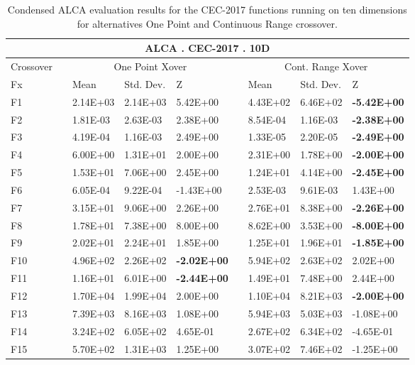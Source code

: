 \documentclass[graybox]{svmult}
\begin{document}
    \begin{table}[]
    \scriptsize
    \centering
    \caption{Condensed ALCA evaluation results for the CEC-2017 functions running on ten dimensions for alternatives One Point and Continuous Range crossover.}\label{tab.condensed_evaluation_10D}
    \begin{tabular}{@{}lllllllll@{}}
    \toprule
    \multicolumn{9}{c}{\textbf{ALCA . CEC-2017 . 10D}} \\ \midrule
    Crossover &  & \multicolumn{3}{c}{One Point Xover} &  & \multicolumn{3}{c}{Cont. Range Xover} \\
    Fx &  & Mean & Std. Dev. & Z &  & Mean & Std. Dev. & Z \\
    F1 &  & 2.14E+03 & 2.14E+03 & 5.42E+00 &  & 4.43E+02 & 6.46E+02 & \textbf{-5.42E+00} \\
    F2 &  & 1.81E-03 & 2.63E-03 & 2.38E+00 &  & 8.54E-04 & 1.16E-03 & \textbf{-2.38E+00} \\
    F3 &  & 4.19E-04 & 1.16E-03 & 2.49E+00 &  & 1.33E-05 & 2.20E-05 & \textbf{-2.49E+00} \\
    F4 &  & 6.00E+00 & 1.31E+01 & 2.00E+00 &  & 2.31E+00 & 1.78E+00 & \textbf{-2.00E+00} \\
    F5 &  & 1.53E+01 & 7.06E+00 & 2.45E+00 &  & 1.24E+01 & 4.14E+00 & \textbf{-2.45E+00} \\
    F6 &  & 6.05E-04 & 9.22E-04 & -1.43E+00 &  & 2.53E-03 & 9.61E-03 & 1.43E+00 \\
    F7 &  & 3.15E+01 & 9.06E+00 & 2.26E+00 &  & 2.76E+01 & 8.38E+00 & \textbf{-2.26E+00} \\
    F8 &  & 1.78E+01 & 7.38E+00 & 8.00E+00 &  & 8.62E+00 & 3.53E+00 & \textbf{-8.00E+00} \\
    F9 &  & 2.02E+01 & 2.24E+01 & 1.85E+00 &  & 1.25E+01 & 1.96E+01 & \textbf{-1.85E+00} \\
    F10 &  & 4.96E+02 & 2.26E+02 & \textbf{-2.02E+00} &  & 5.94E+02 & 2.63E+02 & 2.02E+00 \\
    F11 &  & 1.16E+01 & 6.01E+00 & \textbf{-2.44E+00} &  & 1.49E+01 & 7.48E+00 & 2.44E+00 \\
    F12 &  & 1.70E+04 & 1.99E+04 & 2.00E+00 &  & 1.10E+04 & 8.21E+03 & \textbf{-2.00E+00} \\
    F13 &  & 7.39E+03 & 8.16E+03 & 1.08E+00 &  & 5.94E+03 & 5.03E+03 & -1.08E+00 \\
    F14 &  & 3.24E+02 & 6.05E+02 & 4.65E-01 &  & 2.67E+02 & 6.34E+02 & -4.65E-01 \\
    F15 &  & 5.70E+02 & 1.31E+03 & 1.25E+00 &  & 3.07E+02 & 7.46E+02 & -1.25E+00 \\

\end{tabular}
\end{table}
\end{document}

